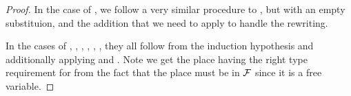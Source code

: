 \begin{proof}
  \vspace{1em}
  \noindent {}

  In the case of , we follow a very similar procedure to
  , but with an empty substituion, and the addition that
  we need to apply  to handle the
  rewriting.

  In the cases of , , ,
  , , , they all
  follow from the induction hypothesis and additionally applying
   and
  . Note we get the place having the right type
  requirement for  from the fact that the place must be in
  $\mathcal{F}$ since it is a free variable.


\end{proof}
